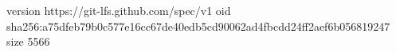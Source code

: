version https://git-lfs.github.com/spec/v1
oid sha256:a75dfeb79b0c577e16cc67de40edb5cd90062ad4fbcdd24ff2aef6b056819247
size 5566
